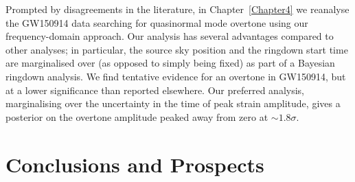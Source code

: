 \documentclass[
12pt, %
english, %
doublespacing, %
headsepline, %
]{MastersDoctoralThesis} %
\begin{document}
\vspace{0.2cm}

\noindent Prompted by disagreements in the literature, in Chapter~\ref{Chapter4} we reanalyse the GW150914 data searching for quasinormal mode overtone using our frequency-domain approach.
Our analysis has several advantages compared to other analyses; in particular, the source sky position and the ringdown start time are marginalised over (as opposed to simply being fixed) as part of a Bayesian ringdown analysis. 
We find tentative evidence for an overtone in GW150914, but at a lower significance than reported elsewhere. 
Our preferred analysis, marginalising over the uncertainty in the time of peak strain amplitude, gives a posterior on the overtone amplitude peaked away from zero at $\sim 1.8 \sigma$.


\mainmatter %

\pagestyle{thesis} %



 

 


\chapter*{Conclusions and Prospects}
\end{document}

